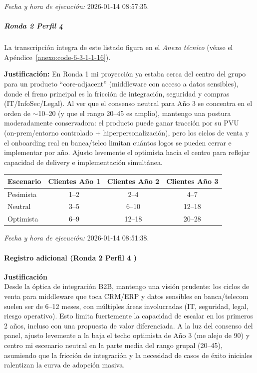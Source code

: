 \textit{Fecha y hora de ejecución:} 2026-01-14 08:57:35.

\subparagraph{Ronda 2 Perfil 4}

La transcripción íntegra de este listado figura en el \textit{Anexo técnico} (véase el Apéndice~\ref{anexo:code-6-3-1-1-16}).

\textbf{Justificación:} En Ronda 1 mi proyección ya estaba cerca del centro del grupo para un producto ``core-adjacent'' (middleware con acceso a datos sensibles), donde el freno principal es la fricción de integración, seguridad y compras (IT/InfoSec/Legal). Al ver que el consenso neutral para Año 3 se concentra en el orden de \mbox{$\sim$10–20} (y que el rango 20–45 es amplio), mantengo una postura moderadamente conservadora: el producto puede ganar tracción por su PVU (on‑prem/entorno controlado + hiperpersonalización), pero los ciclos de venta y el onboarding real en banca/telco limitan cuántos logos se pueden cerrar e implementar por año. Ajusto levemente el optimista hacia el centro para reflejar capacidad de delivery e implementación simultánea.

\begin{center}
\footnotesize
\begin{tabular}{|l|c|c|c|}
\hline
\textbf{Escenario} & \textbf{Clientes Año 1} & \textbf{Clientes Año 2} & \textbf{Clientes Año 3} \\
\hline
Pesimista & 1--2 & 2--4 & 4--7 \\
\hline
Neutral & 3--5 & 6--10 & 12--18 \\
\hline
Optimista & 6--9 & 12--18 & 20--28 \\
\hline
\end{tabular}
\end{center}

\textit{Fecha y hora de ejecución:} 2026-01-14 08:51:38.

\paragraph{Registro adicional (Ronda 2 Perfil 4 )}

\textbf{Justificación}\\
Desde la óptica de integración B2B, mantengo una visión prudente: los ciclos de venta para middleware que toca CRM/ERP y datos sensibles en banca/telecom suelen ser de 6–12 meses, con múltiples áreas involucradas (IT, seguridad, legal, riesgo operativo). Esto limita fuertemente la capacidad de escalar en los primeros 2 años, incluso con una propuesta de valor diferenciada. A la luz del consenso del panel, ajusto levemente a la baja el techo optimista de Año 3 (me alejo de 90) y centro mi escenario neutral en la parte media del rango grupal (20–45), asumiendo que la fricción de integración y la necesidad de casos de éxito iniciales ralentizan la curva de adopción masiva.

